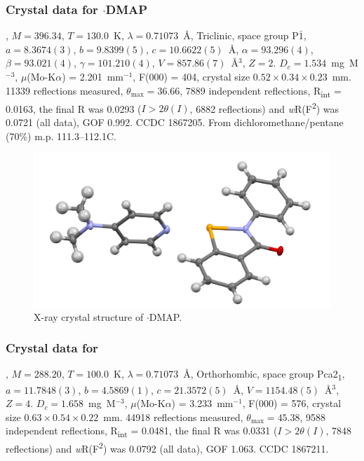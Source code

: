\begin{refsection}
\subsubsection{Crystal data for \texorpdfstring{$\cdot$DMAP}{C20H19N3OSe}}
, $M=396.34$, $T=130.0$~K, $\lambda=0.71073$~\AA, Triclinic, space group P$\bar{1}$, $a = 8.3674(3)$, $b = 9.8399(5)$, $c =10.6622(5)$~\AA, $\alpha=93.296(4)$\degree, $\beta=93.021(4)$\degree, $\gamma=101.210(4)$\degree, $V=857.86(7)$~\AA$^{3}$, $Z = 2$.
$D_{c}= 1.534$~mg~M$^{-3}$, $\mu$(Mo-K$\alpha$) = 2.201~mm$^{-1}$, F(000) = 404, crystal size $0.52 \times 0.34 \times 0.23$~mm.
11339 reflections measured, $\theta_{\mathrm{max}}=36.66$\degree, 7889 independent reflections, R\textsubscript{int} = 0.0163, the final R was 0.0293 ($I > 2\theta(I)$, 6882 reflections) and \emph{w}R(F\textsuperscript{2}) was 0.0721 (all data), GOF 0.992.
CCDC 1867205.
From dichloromethane/pentane (70\%) m.p. 111.3--112.1\degree C.

\begin{figure}
  \includegraphics[width=0.6\linewidth]{Figures/ebs-dmap-xtal.pdf}
  \caption{X-ray crystal structure of \texorpdfstring{$\cdot$DMAP}{C20H19N3OSe}.}
\end{figure}

\subsubsection{Crystal data for \texorpdfstring{}{C14H11NOSe}}
, $M=288.20$, $T=100.0$~K, $\lambda=0.71073$~\AA, Orthorhombic, space group Pca2\textsubscript{1}, $a = 11.7848(3)$, $b = 4.5869(1)$, $c = 21.3572(5)$~\AA, $V = 1154.48(5)$~\AA$^{3}$, $Z = 4$.
$D_{c}= 1.658$~mg~M$^{-3}$, $\mu$(Mo-K$\alpha$) = 3.233~mm$^{-1}$, F(000) = 576, crystal size $0.63 \times 0.54 \times 0.22$~mm.
44918 reflections measured, $\theta_{\mathrm{max}}=45.38$\degree, 9588 independent reflections, R\textsubscript{int} = 0.0481, the final R was 0.0331 ($I > 2\theta(I)$, 7848 reflections) and \emph{w}R(F\textsuperscript{2}) was 0.0792 (all data), GOF 1.063.
CCDC 1867211.


\end{refsection}
